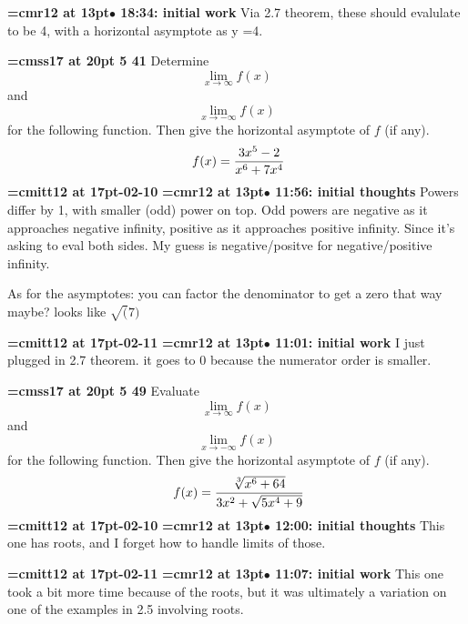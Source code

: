 {\smallskip\noindent\bf\font\titlefont=cmr12 at 13pt\titlefont $\bullet$ 18:34: initial work}\smallskip
Via 2.7 theorem, these should evalulate to be 4, with a horizontal asymptote as y =4.
\par

{\medskip\noindent\bf\font\titlefont=cmss17 at 20pt 5 41}\medskip
Determine
$$\lim_{x \to \infty}{f(x)}$$
and
$$\lim_{x \to -\infty}{f(x)}$$
for the following function. Then give the
horizontal asymptote of $f$ (if any).
$$\
f(x) = {
3x^5 - 2
\over
x^6 + 7x^4
}
$$
{\medskip\noindent\bf\font\titlefont=cmitt12 at 17pt-02-10}\medskip
{\smallskip\noindent\bf\font\titlefont=cmr12 at 13pt\titlefont $\bullet$ 11:56: initial thoughts}\smallskip
Powers differ by 1, with smaller (odd) power on top. Odd powers are negative as it approaches negative infinity, positive as it approaches positive infinity. Since it's asking to eval both sides. My guess is negative/positve for negative/positive infinity.
\par

As for the asymptotes: you can factor the denominator to get a zero that way maybe? looks like $\sqrt(7)$
\par

{\medskip\noindent\bf\font\titlefont=cmitt12 at 17pt-02-11}\medskip
{\smallskip\noindent\bf\font\titlefont=cmr12 at 13pt\titlefont $\bullet$ 11:01: initial work}\smallskip
I just plugged in 2.7 theorem. it goes to 0 because the numerator order is smaller.
\par

{\medskip\noindent\bf\font\titlefont=cmss17 at 20pt 5 49}\medskip
Evaluate
$$\lim_{x \to \infty}{f(x)}$$
and
$$\lim_{x \to -\infty}{f(x)}$$
for the following function. Then give the
horizontal asymptote of $f$ (if any).
$$\
f(x) = {
\root 3 \of {x^6 + 64}
\over
3x^2 + \sqrt {5x^4 + 9}
}
$$
{\medskip\noindent\bf\font\titlefont=cmitt12 at 17pt-02-10}\medskip
{\smallskip\noindent\bf\font\titlefont=cmr12 at 13pt\titlefont $\bullet$ 12:00: initial thoughts}\smallskip
This one has roots, and I forget how to handle limits of those.
\par

{\medskip\noindent\bf\font\titlefont=cmitt12 at 17pt-02-11}\medskip
{\smallskip\noindent\bf\font\titlefont=cmr12 at 13pt\titlefont $\bullet$ 11:07: initial work}\smallskip
This one took a bit more time because of the roots, but it was ultimately a variation on one of the examples in 2.5 involving roots.
\par

